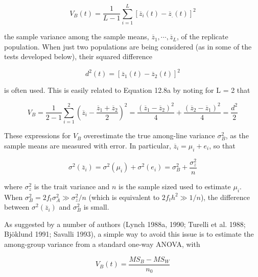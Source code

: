 \documentclass{article}
\begin{document}
\begin{equation}
V_{B}(t)=\frac{1}{L-1}\sum_{i=1}^{L}\left[\overline{z}_{i}(t)-\overline{z}_{.}(t)\right]^{2}
\tag{12.8a}
\label{eq:12_8a}
\end{equation}

the sample variance among the sample means,  $ \overline{z}_{1}, \cdots, \overline{z}_{L} $, of the replicate population. When just two populations are being considered (as in some of the tests developed below), their squared difference

\begin{equation}
d^{2}(t)=\left[\overline{z}_{1}(t)-\overline{z}_{2}(t)\right]^{2}
\tag{12.8b}
\label{eq:12_8b}
\end{equation}

is often used. This is easily related to Equation 12.8a by noting for L = 2 that

\begin{equation}
V_{B}=\frac{1}{2-1}\sum_{i=1}^{2}\left(\overline{z}_{i}-\frac{\overline{z}_{1}+\overline{z}_{2}}{2}\right)^{2}=\frac{\left(\overline{z}_{1}-\overline{z}_{2}\right)^{2}}{4}+\frac{\left(\overline{z}_{2}-\overline{z}_{1}\right)^{2}}{4}=\frac{d^{2}}{2}
\tag{12.8c}
\label{eq:12_8c}
\end{equation}

These expressions for  $ V_B $ overestimate the true among-line variance  $ \sigma_B^2 $, as the sample means are measured with error. In particular,  $ \overline{z}_i = \mu_i + e_i $, so that

\begin{equation}
\sigma^{2}(\overline{z}_{i})=\sigma^{2}(\mu_{i})+\sigma^{2}(e_{i})=\sigma_{B}^{2}+\frac{\sigma_{z}^{2}}{n}
\tag{12.8d}
\label{eq:12_8d}
\end{equation}

where  $ \sigma_z^2 $ is the trait variance and  $ n $ is the sample sized used to estimate  $ \mu_i $. When  $ \sigma_B^2 = 2f_t\sigma_A^2 \gg \sigma_z^2/n $ (which is equivalent to  $ 2f_t h^2 \gg 1/n $), the difference between  $ \sigma^2(\overline{z}_i) $ and  $ \sigma_B^2 $ is small.

As suggested by a number of authors (Lynch 1988a, 1990; Turelli et al. 1988; Bjöklund 1991; Savalli 1993), a simple way to avoid this issue is to estimate the among-group variance from a standard one-way ANOVA, with

\begin{equation}
V_{B}(t)=\frac{MS_{B}-MS_{W}}{n_{0}}
\tag{12.8e}
\label{eq:12_8e}
\end{equation}
\end{document}
